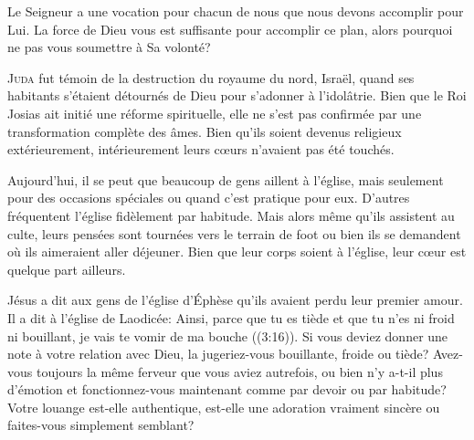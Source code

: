 Le Seigneur a une vocation pour chacun de nous que nous devons accomplir
 pour Lui. La force de Dieu vous est suffisante pour accomplir ce plan,
 alors pourquoi ne pas vous soumettre à Sa volonté? 

\dvrule






\lettrine{J}{uda} fut témoin de la destruction du royaume du nord, Israël,
 quand ses habitants s'étaient détournés de Dieu pour s'adonner
 à l'idolâtrie. Bien que le Roi Josias ait initié une réforme spirituelle,
 elle ne s'est pas confirmée par une transformation complète des âmes.
 Bien qu'ils soient devenus religieux extérieurement,
 intérieurement leurs c\oe{}urs n'avaient pas 
 été touchés. 

Aujourd'hui, il se peut que beaucoup de gens aillent à l'église,
 mais seulement pour des occasions spéciales ou quand c'est pratique pour eux.
 D'autres fréquentent l'église fidèlement \ocadr par habitude.
 Mais alors même qu'ils assistent au culte, leurs pensées sont tournées
 vers le terrain de foot ou bien ils se demandent où ils aimeraient
 aller déjeuner. Bien que leur corps soient à l'église,
 leur c\oe{}ur est quelque part ailleurs. 


Jésus a dit aux gens de l'église d'Éphèse qu'ils avaient perdu
 leur premier amour. Il a dit à l'église de Laodicée: 
 \Og Ainsi, parce que tu es tiède et que tu n'es ni froid ni bouillant,
 je vais te vomir de ma bouche \Fg{} 
 ((3:16)).
 Si vous deviez donner une note à votre relation avec Dieu,
 la jugeriez-vous bouillante, froide ou tiède?
 Avez-vous toujours la même ferveur que vous aviez autrefois,
 ou bien n'y a-t-il plus d'émotion et fonctionnez-vous maintenant
 comme par devoir ou par habitude? Votre louange est-elle authentique,
 est-elle une adoration vraiment sincère ou faites-vous simplement semblant? 

